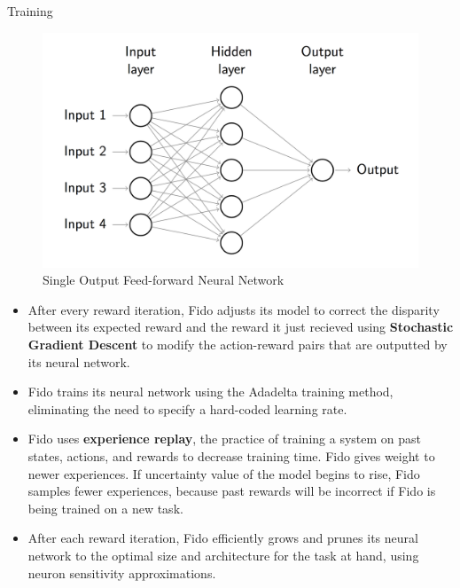 \documentclass[final]{beamer}
\newlength{\onecolwid}
\newlength{\twocolwid}
\begin{document}
\begin{frame}[t]
\begin{columns}[t]
\begin{column}{\twocolwid}
\begin{columns}[t,totalwidth=\twocolwid]
\begin{column}{\onecolwid}
\begin{block}{Training}
	\begin{figure}
		\centering
		\includegraphics[width=.8\linewidth]{Figures/FeedForwardRendered}
		\caption{Single Output Feed-forward Neural Network}
		\label{fig:feedforward}
	\end{figure}

	\begin{itemize}
		\item After every reward iteration, Fido adjusts its model to correct the disparity between its expected reward and the reward it just recieved using \textbf{Stochastic Gradient Descent} to modify the action-reward pairs that are outputted by its neural network.
		\item Fido trains its neural network using the Adadelta training method, eliminating the need to specify a hard-coded learning rate.
		\item Fido uses \textbf{experience replay}, the practice of training a system on past states, actions, and rewards to decrease training time. Fido gives weight to newer experiences. If uncertainty value of the model begins to rise, Fido samples fewer experiences, because past rewards will be incorrect if Fido is being trained on a new task.
		\item After each reward iteration, Fido efficiently grows and prunes its neural network to the optimal size and architecture for the task at hand, using neuron sensitivity approximations.
	\end{itemize}

\end{block}

\end{column}


\end{columns}
\end{column}
\end{columns}
\end{frame}
\end{document}
